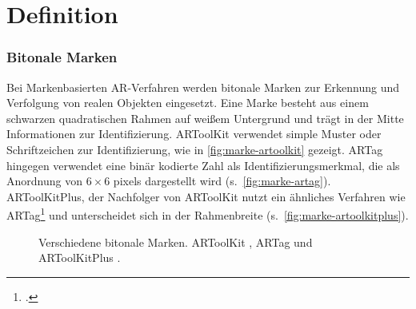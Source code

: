 \section{Definition} %
\label{sec:definition}
\begin{comment}
	Definiere Begriffe der Augmented Reality und Bildverarbeitung, die dem Leser nicht geläufig sind. Denke dabei an Prof. Klocke als Leser ohne besonderen Kenntnisstand in der AR/Bildverarbeitung.
\end{comment}

\subsubsection{Bitonale Marken}
\label{sub:bitonalemarken}
Bei Markenbasierten \gls{AR}-Verfahren werden bitonale Marken zur Erkennung und Verfolgung von realen Objekten
 eingesetzt. Eine Marke besteht aus einem schwarzen quadratischen Rahmen auf weißem Untergrund und trägt in der Mitte
 Informationen zur Identifizierung. ARToolKit verwendet simple Muster oder Schriftzeichen zur Identifizierung, wie in
 \autoref{fig:marke-artoolkit} gezeigt. ARTag hingegen verwendet eine binär kodierte Zahl als Identifizierungsmerkmal,
 die als Anordnung von $6 \times 6$ \glspl{pixel} dargestellt wird (s.~\autoref{fig:marke-artag}). ARToolKitPlus, der
 Nachfolger von ARToolKit nutzt ein ähnliches Verfahren wie ARTag\footcite[Vgl.][S.~142]{wagner07b} und unterscheidet
 sich in der Rahmenbreite (s.~\autoref{fig:marke-artoolkitplus}).

\begin{figure}[!ht]
	\centering
	\caption{Verschiedene bitonale Marken.
		ARToolKit , ARTag  und ARToolKitPlus .
	}
	\label{fig:bitonale-marken}
\end{figure}

\begin{comment}
	(wagner/schmalstieg ARToolKitPlus fpr Pose Tracking on Mobile Devices S.4)

	Beim Fiducial Marker Tracking werden künstliche Marken zur Erkennung und Verfolgung von realen Objekten eingesetzt. Häufig werden für diese Marken quadratische schwarze Rahmen verwendet die innerhalb des Rahmens Schriftzeichen, Bilder oder 2D Codes enthalten. Diese Marken sind einfach herzustellen und können mit geringem Aufwand an Objekte angebracht werden.

	Diese bitonale Marken haben den Vorteil, dass sie Robust gegen Helligkeitsveränderung sind und die Entscheidung eines Pixels auf eine Schwellwert-Entscheidung reduziert werden kann. Marken für \gls{AR} müssen in einem großen Blickfeld erkannt werden können, was wiederum bei industriellen Anwendung nicht der Fall ist, da hier Marken den größten Teil des Bildes einnehmen können.
\end{comment}

